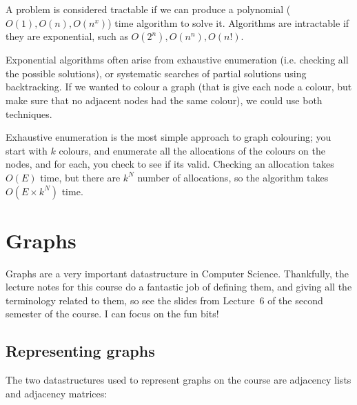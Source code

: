A problem is considered tractable if we can produce a polynomial ($O(1), O(n),
O(n^x)$) time algorithm to solve it. Algorithms are intractable if they are
exponential, such as $O(2^n), O(n^n), O(n!)$.

Exponential algorithms often arise from exhaustive enumeration (i.e. checking
all the possible solutions), or systematic searches of partial solutions using
backtracking. If we wanted to colour a graph (that is give each node a colour,
but make sure that no adjacent nodes had the same colour), we could use both
techniques.

Exhaustive enumeration is the most simple approach to graph colouring; you start
with $k$ colours, and enumerate all the allocations of the colours on the nodes,
and for each, you check to see if its valid. Checking an allocation takes $O(E)$
time,  but
there are $k^N$ number of allocations, so the algorithm takes $O(E \times k^N)$
time.

\section{Graphs}

Graphs are a very important datastructure in Computer Science. Thankfully, the
lecture notes for this course do a fantastic job of defining them, and giving
all the terminology related to them, so see the slides from Lecture~6 of the
second semester of the course. I can focus on the fun bits!

\subsection{Representing graphs}

The two datastructures used to represent graphs on the course are adjacency
lists and adjacency matrices:

